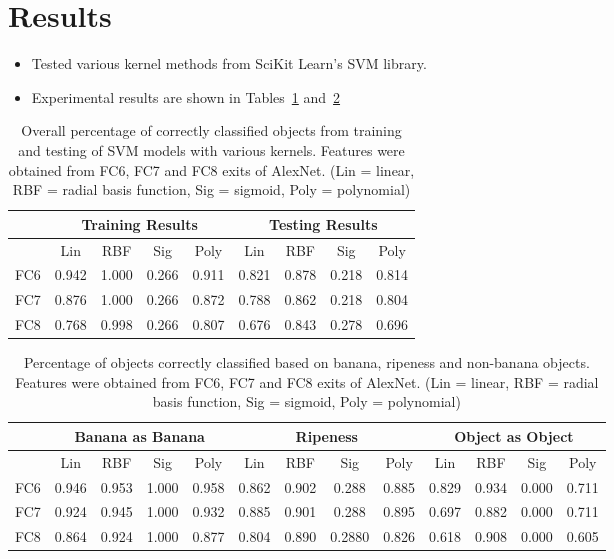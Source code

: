 \documentclass{article} %
\begin{document}
 \section{Results}
\begin{itemize}
\item Tested various kernel methods from SciKit Learn's SVM library.
\item Experimental results are shown in Tables~\ref{tab:core} and~\ref{tab:banana}
\end{itemize}
\begin{table}[h]
\caption{Overall percentage of correctly classified objects from training and testing of SVM models with various kernels. Features were obtained from FC6, FC7 and FC8 exits of AlexNet. (Lin = linear, RBF = radial basis function, Sig = sigmoid, Poly = polynomial)}
\label{tab:core}
\centering
\begin{tabular}{|c|c|c|c|c|c|c|c|c|}\hline
 &  \multicolumn{4}{c|}{Training Results} & \multicolumn{4}{c|}{Testing Results}\\\hline
&Lin& RBF&Sig&Poly&Lin& RBF&Sig&Poly\\\hline
FC6&0.942&1.000&0.266&0.911&0.821&0.878&0.218&0.814\\\hline
FC7&0.876&1.000&0.266&0.872&0.788&0.862&0.218&0.804\\\hline
FC8&0.768&0.998&0.266&0.807&0.676&0.843&0.278&0.696\\\hline
\end{tabular}
\end{table}

\begin{table}[h]
\centering
\caption{Percentage of objects correctly classified based on banana, ripeness and non-banana objects. Features were obtained from FC6, FC7 and FC8 exits of AlexNet. (Lin = linear, RBF = radial basis function, Sig = sigmoid, Poly = polynomial)}
\label{tab:banana}
\begin{tabular}{|c|c|c|c|c|c|c|c|c|c|c|c|c|}\hline
 &  \multicolumn{4}{c|}{Banana as Banana} & \multicolumn{4}{c|}{Ripeness}& \multicolumn{4}{c|}{Object as Object}\\\hline
&Lin& RBF&Sig&Poly&Lin& RBF&Sig&Poly&Lin& RBF&Sig&Poly\\\hline
FC6&0.946&0.953&1.000&0.958&0.862&0.902&0.288&0.885&0.829&0.934&0.000&0.711\\\hline
FC7&0.924&0.945&1.000&0.932&0.885&0.901&0.288&0.895&0.697&0.882&0.000&0.711\\\hline
FC8&0.864&0.924&1.000&0.877&0.804&0.890&0.2880&0.826&0.618&0.908&0.000&0.605\\\hline
\end{tabular}
\end{table}
\end{document}
